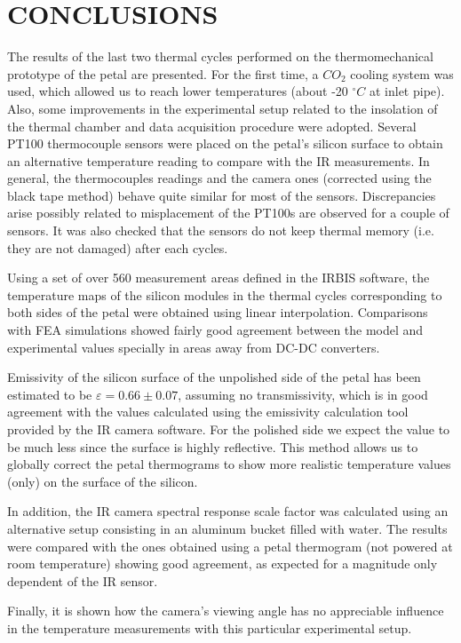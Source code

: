\pagestyle{conclusions}

\section*{\uppercase{Conclusions}}\label{concl}
	\bigskip
	\bigskip
	The results of the last two thermal cycles performed on the thermomechanical prototype of the petal are presented. For the first time, a $CO_{2}$ cooling system was used, which allowed us to reach lower temperatures (about -20 $^\circ C$ at inlet pipe). Also, some improvements in the experimental setup related to the insolation of the thermal chamber and data acquisition procedure were adopted. Several PT100 thermocouple sensors were placed on the petal’s silicon surface to obtain an alternative temperature reading to compare with the IR measurements. In general, the thermocouples readings and the camera ones (corrected using the black tape method) behave quite similar for most of the sensors. Discrepancies arise possibly related to misplacement of the PT100s are observed for a couple of sensors. It was also checked that the sensors do not keep thermal memory (i.e. they are not damaged) after each cycles.
	
	Using a set of over 560 measurement areas defined in the IRBIS software, the temperature maps of the silicon modules in the thermal cycles corresponding to both sides of the petal were obtained using linear interpolation. Comparisons with FEA simulations showed fairly good agreement between the model and experimental values specially in areas away from DC-DC converters.
	
	Emissivity of the silicon surface of the unpolished side of the petal has been estimated to be $\varepsilon=0.66 \pm 0.07$, assuming no transmissivity, which is in good agreement with the values calculated using the emissivity calculation tool provided by the IR camera software. For the polished side we expect the value to be much less since the surface is highly reflective. This method allows us to globally correct the petal thermograms to show more realistic temperature values (only) on the surface of the silicon. 
	
	In addition, the IR camera spectral response scale factor was calculated using an alternative setup consisting in an aluminum bucket filled with water. The results were compared with the ones obtained using a petal thermogram (not powered at room temperature) showing good agreement, as expected for a magnitude only dependent of the IR sensor.
	
	Finally, it is shown how the camera’s viewing angle has no appreciable influence in the temperature measurements with this particular experimental setup.
	 
	